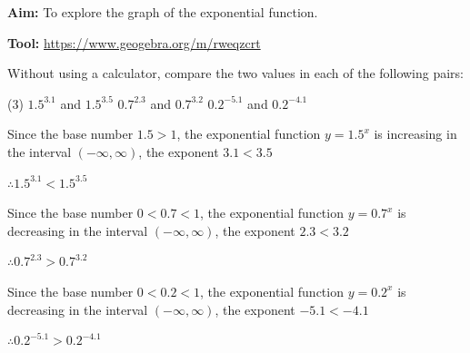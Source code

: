 \documentclass{report}
\begin{document}
    \begin{explore}
        
        \textbf{Aim:} To explore the graph of the exponential function.
        
        \textbf{Tool:} \url{https://www.geogebra.org/m/rweqzcrt}
    \end{explore}
    \vspace{1em}

    \begin{question}
        Without using a calculator, compare the two values in each of the following pairs:
        \begin{tasks}[label=(\alph*)](3)
            \task $1.5^{3.1}$ and $1.5^{3.5}$
            \task $0.7^{2.3}$ and $0.7^{3.2}$
            \task $0.2^{-5.1}$ and $0.2^{-4.1}$
        \end{tasks}

        \sol{}
        \begin{tasks}[label=(\alph*)]
            \task Since the base number $1.5>1$, the exponential function $y=1.5^x$ is increasing in the interval $(-\infty, \infty)$,
            the exponent $3.1<3.5$
            
            $
            \therefore 1.5^{3.1}<1.5^{3.5}
            $

            \task Since the base number $0<0.7<1$, the exponential function $y=0.7^x$ is decreasing in the interval $(-\infty, \infty)$,
            the exponent $2.3<3.2$
            
            $
            \therefore 0.7^{2.3}>0.7^{3.2}
            $

            \task Since the base number $0<0.2<1$, the exponential function $y=0.2^x$ is decreasing in the interval $(-\infty, \infty)$,
            the exponent $-5.1<-4.1$

            $
            \therefore 0.2^{-5.1}>0.2^{-4.1}
            $
        \end{tasks}
    \end{question}
\vspace{-1em}
\end{document}
